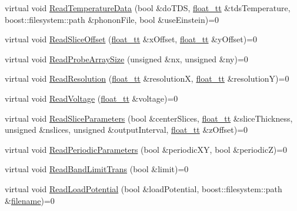 \begin{DoxyCompactItemize}
\item 
virtual void \hyperlink{class_q_s_t_e_m_1_1_i_config_reader_a2d5f0a97bb386bed28e52038c46b3100}{Read\-Temperature\-Data} (bool \&do\-T\-D\-S, \hyperlink{namespace_q_s_t_e_m_a915d7caa497280d9f927c4ce8d330e47}{float\-\_\-tt} \&tds\-Temperature, boost\-::filesystem\-::path \&phonon\-File, bool \&use\-Einstein)=0
\item 
virtual void \hyperlink{class_q_s_t_e_m_1_1_i_config_reader_a6031e46b925738b47cc8e4c5e97c98c9}{Read\-Slice\-Offset} (\hyperlink{namespace_q_s_t_e_m_a915d7caa497280d9f927c4ce8d330e47}{float\-\_\-tt} \&x\-Offset, \hyperlink{namespace_q_s_t_e_m_a915d7caa497280d9f927c4ce8d330e47}{float\-\_\-tt} \&y\-Offset)=0
\item 
virtual void \hyperlink{class_q_s_t_e_m_1_1_i_config_reader_a8fb7b3253bd5cc8feb973a675379436e}{Read\-Probe\-Array\-Size} (unsigned \&nx, unsigned \&ny)=0
\item 
virtual void \hyperlink{class_q_s_t_e_m_1_1_i_config_reader_abcca29c3d4a70b602f61d37e89cea84d}{Read\-Resolution} (\hyperlink{namespace_q_s_t_e_m_a915d7caa497280d9f927c4ce8d330e47}{float\-\_\-tt} \&resolution\-X, \hyperlink{namespace_q_s_t_e_m_a915d7caa497280d9f927c4ce8d330e47}{float\-\_\-tt} \&resolution\-Y)=0
\item 
virtual void \hyperlink{class_q_s_t_e_m_1_1_i_config_reader_a5a3960e3d696b36f142c4292515b9c0a}{Read\-Voltage} (\hyperlink{namespace_q_s_t_e_m_a915d7caa497280d9f927c4ce8d330e47}{float\-\_\-tt} \&voltage)=0
\item 
virtual void \hyperlink{class_q_s_t_e_m_1_1_i_config_reader_abf18acda27bd8a5bf9ec60cfcca03d49}{Read\-Slice\-Parameters} (bool \&center\-Slices, \hyperlink{namespace_q_s_t_e_m_a915d7caa497280d9f927c4ce8d330e47}{float\-\_\-tt} \&slice\-Thickness, unsigned \&nslices, unsigned \&output\-Interval, \hyperlink{namespace_q_s_t_e_m_a915d7caa497280d9f927c4ce8d330e47}{float\-\_\-tt} \&z\-Offset)=0
\item 
virtual void \hyperlink{class_q_s_t_e_m_1_1_i_config_reader_a0141524736558ac9b1ae60d773908b1c}{Read\-Periodic\-Parameters} (bool \&periodic\-X\-Y, bool \&periodic\-Z)=0
\item 
virtual void \hyperlink{class_q_s_t_e_m_1_1_i_config_reader_ab45a70913716642c9e1e957eca4fe2b8}{Read\-Band\-Limit\-Trans} (bool \&limit)=0
\item 
virtual void \hyperlink{class_q_s_t_e_m_1_1_i_config_reader_a3303380663fa527c56f11b710a36f4c6}{Read\-Load\-Potential} (bool \&load\-Potential, boost\-::filesystem\-::path \&\hyperlink{write_fields2_file_8m_af3723aa817dbb65282d5e1db81f08ad8}{filename})=0

\end{DoxyCompactItemize}
